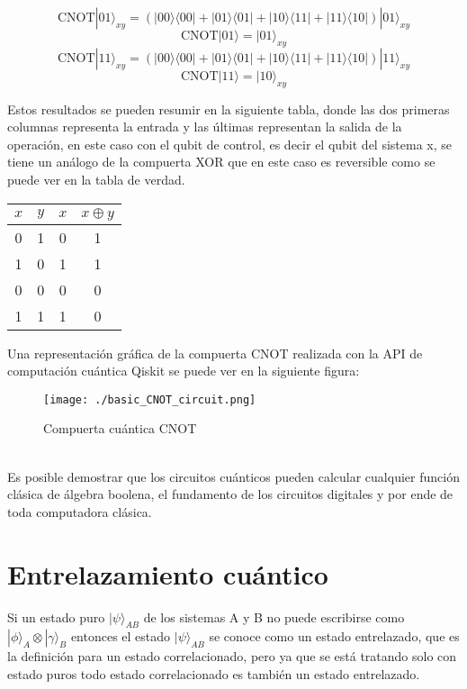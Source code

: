 \documentclass[a4paper]{article}
\begin{document}
\begin{equation}
\text{CNOT}|01\rangle_{xy}=(|00\rangle\langle 00|+|01\rangle\langle 01|+|10\rangle\langle 11|+|11\rangle\langle 10|)|01\rangle_{xy}
\end{equation}
\begin{equation*}
\text{CNOT}|01\rangle=|01\rangle_{xy}
\end{equation*}
\begin{equation}
\text{CNOT}|11\rangle_{xy}=(|00\rangle\langle 00|+|01\rangle\langle 01|+|10\rangle\langle 11|+|11\rangle\langle 10|)|11\rangle_{xy}
\end{equation}
\begin{equation*}
\text{CNOT}|11\rangle=|10\rangle_{xy}
\end{equation*}

Estos resultados se pueden resumir en la siguiente tabla, donde las dos primeras columnas representa la entrada y las últimas representan la salida de la operación, en este caso con el qubit de control, es decir el qubit del sistema x, se tiene un análogo de la compuerta XOR que en este caso es reversible como se puede ver en la tabla de verdad.
\begin{center}
\begin{tabular}{ |c|c|c|c| } 
 \hline
 $x$ & $y$ & $x$ & $x\oplus y$ \\ \hline
 0   & 1   &  0 &    1\\
 1   & 0   &  1 &    1\\
 0   & 0   &  0 &    0\\
 1   & 1   &  1 &    0\\ 
 \hline
\end{tabular}
\end{center}
Una representación gráfica de la compuerta CNOT realizada con la API de computación cuántica Qiskit se puede ver en la siguiente figura:
\begin{figure}[h]
\begin{center}
\texttt{[image: ./basic\_CNOT\_circuit.png]} 
\end{center} 
\caption{Compuerta cuántica CNOT}
\label{fig::NOT_gate}
\end{figure}\\
Es posible demostrar que los circuitos cuánticos pueden calcular cualquier función clásica de álgebra boolena, el fundamento de los circuitos digitales y por ende de toda computadora clásica.

\section{Entrelazamiento cuántico}
Si un estado  puro $|\psi\rangle_{AB}$ de los sistemas A y B no puede escribirse como $|\phi\rangle_A\otimes |\gamma\rangle_B$ entonces el estado $|\psi\rangle_{AB}$ se conoce como un estado entrelazado, que es la definición para un estado correlacionado, pero ya que se está tratando solo con estado puros todo estado correlacionado es también un estado entrelazado.
\end{document}
